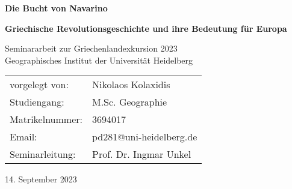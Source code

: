 \documentclass[preprint]{geomorphica} %
\begin{document}


\begin{titlepage}
\begin{center}

\vspace{-20mm}
\vspace*{20mm}

\begin{Huge}
\textbf{Die Bucht von Navarino}
\end{Huge}

\begin{LARGE}
\textbf{Griechische Revolutionsgeschichte und ihre Bedeutung für Europa} \\ [6pt]
\end{LARGE}

\vspace{50mm}

\begin{Large}
Seminararbeit zur Griechenlandexkursion 2023 \\
Geographisches Institut der Universität Heidelberg \\
\end{Large}

\vspace{50mm}

\begin{table}[ht]
    \begin{center}
        \begin{tabular}{l l} 
        vorgelegt von: & Nikolaos Kolaxidis \\ [6pt]
        Studiengang: & M.Sc. Geographie \\ [6pt]
        Matrikelnummer: & 3694017 \\ [6pt]
        Email: & pd281@uni-heidelberg.de \\ [6pt]
        Seminarleitung: & Prof. Dr. Ingmar Unkel \\
        \end{tabular}
    \end{center}
\end{table}

\vspace*{\fill}
14. September 2023

\end{center}
\end{titlepage}

\end{document}
